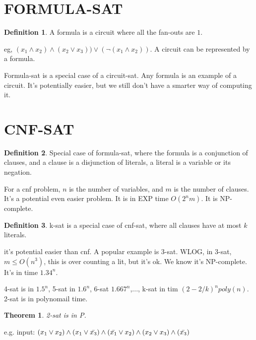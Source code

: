 \documentclass{article}
\theoremstyle{plain}
\newtheorem{theorem}{Theorem}[section]
\theoremstyle{definition}
\newtheorem{definition}{Definition}[section] %
\begin{document}
\section{FORMULA-SAT}

\begin{definition}
A formula is a circuit where all the fan-outs are $1$. 
\end{definition}
eg, $(x_1 \land x_2) \land (x_2 \lor x_3)) \lor (\lnot(x_1 \land x_2))$. A circuit can be represented by a formula. 

Formula-sat is a special case of a circuit-sat. Any formula is an example of a circuit. It's potentially easier, but we still don't have a smarter way of computing it. 

\section{CNF-SAT}

\begin{definition}
Special case of formula-sat, where the formula is a conjunction of clauses, and a clause is a disjunction of literals, a literal is a variable or its negation. 
\end{definition}

For a cnf problem, $n$ is the number of variables, and $m$ is the number of clauses. It's a potential even easier problem. It is in EXP time $O(2^nm)$. It is NP-complete. 

\begin{definition}
k-sat is a special case of cnf-sat, where all clauses have at most $k$ literals. 
\end{definition}
it's potential easier than cnf. A popular example is 3-sat. WLOG, in 3-sat, $m \le O(n^3)$, this is over counting a lit, but it's ok. We know it's NP-complete. It's in time $1.34^n$.

4-sat is in $1.5^n$, 5-sat in $1.6^n$, 6-sat $1.667^n$,..., k-sat in tim $(2-2/k)^n poly(n)$. 2-sat is in polynomail time. 

\begin{theorem}
2-sat is in P. 
\end{theorem}

e.g. input: $(x_1\lor x_2)\land(x_1 \lor \Bar{x_3}) \land (\Bar{x_1} \lor x_2) \land (x_2 \lor x_3) \land (\Bar{x_3})$
\end{document}
